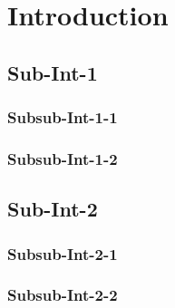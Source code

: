 \chapter{Introduction}%
\label{chap:introduction}%
\par\bigskip\noindent%
\TUMchaptertableofcontents%
\begingroup%
%
\section{Sub-Int-1}%
\label{sec:introduction:Sub-Int-1}%
\endgroup%
\subsection{Subsub-Int-1-1}%
\label{subsec:introduction:Sub-Int-1:Subsub-Int-1-1}%
\subsection{Subsub-Int-1-2}%
\label{subsec:introduction:Sub-Int-1:Subsub-Int-1-2}%
\section{Sub-Int-2}%
\label{sec:introduction:Sub-Int-2}%
\subsection{Subsub-Int-2-1}%
\label{subsec:introduction:Sub-Int-2:Subsub-Int-2-1}%
\subsection{Subsub-Int-2-2}%
\label{subsec:introduction:Sub-Int-2:Subsub-Int-2-2}%
